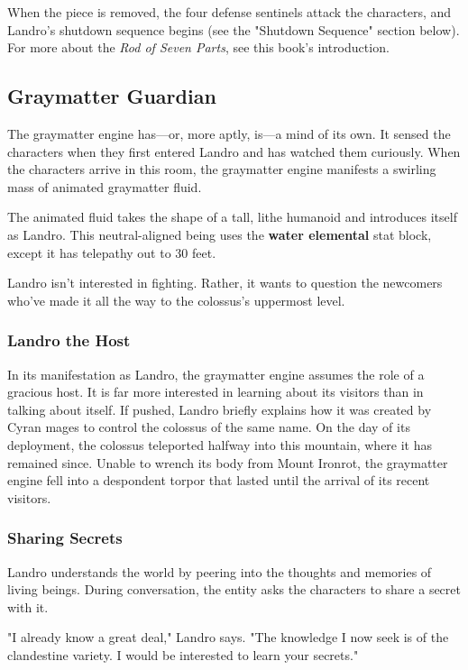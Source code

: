 \documentclass[10pt,a4paper,twoside,bg=print,twocolumn,openany,nodeprecatedcode]{dndbook}
\begin{document}
When the piece is removed, the four defense sentinels attack the characters, and Landro's shutdown sequence begins (see the "Shutdown Sequence" section below). For more about the \textit{Rod of Seven Parts}, see this book's introduction.

\subsection{Graymatter Guardian}
The graymatter engine has—or, more aptly, is—a mind of its own. It sensed the characters when they first entered Landro and has watched them curiously. When the characters arrive in this room, the graymatter engine manifests a swirling mass of animated graymatter fluid.

The animated fluid takes the shape of a tall, lithe humanoid and introduces itself as Landro. This neutral-aligned being uses the \textbf{water elemental} stat block, except it has telepathy out to 30 feet.

Landro isn't interested in fighting. Rather, it wants to question the newcomers who've made it all the way to the colossus's uppermost level.

\subsubsection{Landro the Host}
In its manifestation as Landro, the graymatter engine assumes the role of a gracious host. It is far more interested in learning about its visitors than in talking about itself. If pushed, Landro briefly explains how it was created by Cyran mages to control the colossus of the same name. On the day of its deployment, the colossus teleported halfway into this mountain, where it has remained since. Unable to wrench its body from Mount Ironrot, the graymatter engine fell into a despondent torpor that lasted until the arrival of its recent visitors.

\subsubsection{Sharing Secrets}
Landro understands the world by peering into the thoughts and memories of living beings. During conversation, the entity asks the characters to share a secret with it.

\begin{DndReadAloud}{}
"I already know a great deal," Landro says. "The knowledge I now seek is of the clandestine variety. I would be interested to learn your secrets."

\end{DndReadAloud}
\end{document}
